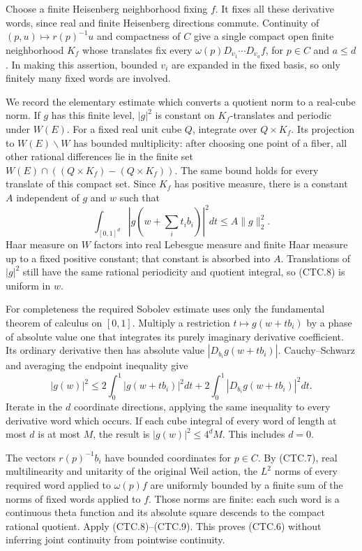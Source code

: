 Choose a finite Heisenberg neighborhood fixing $f$.  It fixes all
these derivative words, since real and finite Heisenberg directions
commute.  Continuity of $(p,u)\mapsto r(p)^{-1}u$ and compactness of
$C$ give a single compact open finite neighborhood $K_f$ whose
translates fix every $\omega(p)D_{v_1}\cdots D_{v_a}f$, for $p\in C$
and $a\le d$.  In making this assertion, bounded $v_i$ are expanded
in the fixed basis, so only finitely many fixed words are involved.

We record the elementary estimate which converts a quotient norm
to a real-cube norm.  If $g$ has this finite level, $|g|^2$ is
constant on $K_f$-translates and periodic under $W(E)$.  For a fixed
real unit cube $Q$, integrate over $Q\times K_f$.  Its projection
to $W(E)\backslash W$ has bounded multiplicity: after choosing one
point of a fiber, all other rational differences lie in the finite
set $W(E)\cap((Q\times K_f)-(Q\times K_f))$.  The same bound holds
for every translate of this compact set.  Since $K_f$ has positive
measure, there is a constant $A$ independent of $g$ and $w$ such that
\[
 \int_{[0,1]^d}\left|g\left(w+\sum_i t_i b_i\right)\right|^2dt
             \le A\|g\|_2^2.
 \tag{CTC.8}
\]
Haar measure on $W$ factors into real Lebesgue measure and finite
Haar measure up to a fixed positive constant; that constant is
absorbed into $A$.  Translations of $|g|^2$ still have the same
rational periodicity and quotient integral, so (CTC.8) is uniform
in $w$.

For completeness the required Sobolev estimate uses only the
fundamental theorem of calculus on $[0,1]$.  Multiply a restriction
$t\mapsto g(w+tb_i)$ by a phase of absolute value one that integrates
its purely imaginary derivative coefficient.  Its ordinary
derivative then has absolute value $|D_{b_i}g(w+tb_i)|$.  Cauchy--Schwarz
and averaging the endpoint inequality give
\[
 |g(w)|^2\le 2\int_0^1|g(w+tb_i)|^2dt
                 +2\int_0^1|D_{b_i}g(w+tb_i)|^2dt.
 \tag{CTC.9}
\]
Iterate in the $d$ coordinate directions, applying the same inequality
to every derivative word which occurs.  If each cube integral of
every word of length at most $d$ is at most $M$, the result is
$|g(w)|^2\le4^dM$.  This includes $d=0$.

The vectors $r(p)^{-1}b_i$ have bounded coordinates for $p\in C$.
By (CTC.7), real multilinearity and unitarity of the original Weil
action, the $L^2$ norms of every required word applied to
$\omega(p)f$ are uniformly bounded by a finite sum of the norms
of fixed words applied to $f$.  Those norms are finite: each such
word is a continuous theta function and its absolute square descends
to the compact rational quotient.  Apply (CTC.8)--(CTC.9).  This proves
(CTC.6) without inferring joint continuity from pointwise continuity.

